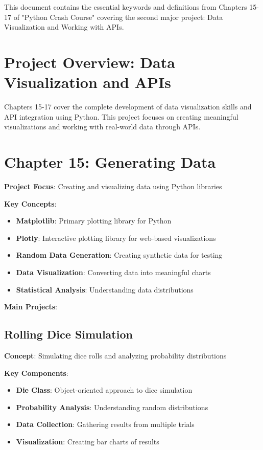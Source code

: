 
This document contains the essential keywords and definitions from Chapters 15-17 of "Python Crash Course" covering the second major project: Data Visualization and Working with APIs.

\section*{Project Overview: Data Visualization and APIs}
Chapters 15-17 cover the complete development of data visualization skills and API integration using Python. This project focuses on creating meaningful visualizations and working with real-world data through APIs.

\section*{Chapter 15: Generating Data}
\textbf{Project Focus}: Creating and visualizing data using Python libraries

\textbf{Key Concepts}:
\begin{itemize}
    \item \textbf{Matplotlib}: Primary plotting library for Python
    \item \textbf{Plotly}: Interactive plotting library for web-based visualizations
    \item \textbf{Random Data Generation}: Creating synthetic data for testing
    \item \textbf{Data Visualization}: Converting data into meaningful charts
    \item \textbf{Statistical Analysis}: Understanding data distributions
\end{itemize}

\textbf{Main Projects}:

\subsection*{Rolling Dice Simulation}
\textbf{Concept}: Simulating dice rolls and analyzing probability distributions

\textbf{Key Components}:
\begin{itemize}
    \item \textbf{Die Class}: Object-oriented approach to dice simulation
    \item \textbf{Probability Analysis}: Understanding random distributions
    \item \textbf{Data Collection}: Gathering results from multiple trials
    \item \textbf{Visualization}: Creating bar charts of results
\end{itemize}

